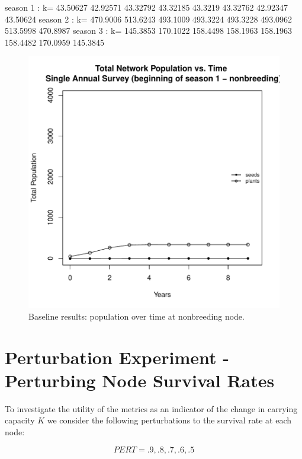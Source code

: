 \documentclass[10pt]{article}
\begin{document}
\begin{Schunk}
\begin{Soutput}
season 1 : k= 43.50627 42.92571 43.32792 43.32185 43.3219 43.32762 42.92347 43.50624
season 2 : k= 470.9006 513.6243 493.1009 493.3224 493.3228 493.0962 513.5998 470.8987
season 3 : k= 145.3853 170.1022 158.4498 158.1963 158.1963 158.4482 170.0959 145.3845
\end{Soutput}
\end{Schunk}



\begin{figure}[H]
\begin{center}
\includegraphics[width=.7\textwidth, height=.6\textwidth]{RGraphics-plantbaseline}
\caption{Baseline results: population over time at nonbreeding node.}\label{fig:plantbaseline}
\end{center}
\end{figure}

\clearpage


\section{Perturbation Experiment - Perturbing Node Survival Rates}

To investigate the utility of the metrics as an indicator of the change in carrying capacity $K$ we consider the following perturbations to the survival rate at each node:

\[PERT = .9, .8, .7, .6, .5\]
\end{document}
